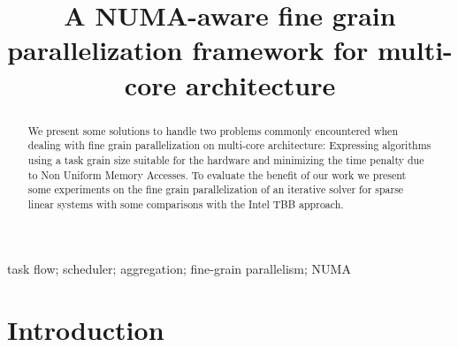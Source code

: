 \documentclass[10pt, conference, compsocconf]{IEEEtran}
\begin{document}
\title{A NUMA-aware fine grain parallelization framework for multi-core architecture}



\author{
\and
{}
\and
{}
\and
{}
}


\maketitle


\begin{abstract}
 We present some solutions to handle two problems commonly encountered when dealing with fine grain parallelization
 on multi-core architecture: Expressing algorithms using a task grain size suitable for the hardware and 
 minimizing the time penalty due to Non Uniform Memory Accesses.
 To evaluate the benefit of our work we present some experiments on the fine grain parallelization of an iterative solver 
  for sparse linear systems with some comparisons with the Intel TBB approach.
\end{abstract}

\begin{IEEEkeywords}
task flow; scheduler; aggregation; fine-grain parallelism; NUMA
\end{IEEEkeywords}


\IEEEpeerreviewmaketitle


\section{Introduction}

\end{document}
